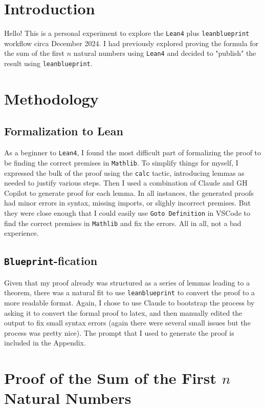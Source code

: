 


\chapter{Introduction}
Hello!  This is a personal experiment to explore the \texttt{Lean4} plus \texttt{leanblueprint} workflow circa
December 2024.  I had previously explored proving the formula for the sum of the first $n$ natural numbers 
using \texttt{Lean4} and decided to "publish" the result using \texttt{leanblueprint}.     

\chapter{Methodology}
\section{Formalization to Lean}
As a beginner to \texttt{Lean4}, I found the most difficult part of formalizing the proof to be finding the correct premises 
in \texttt{Mathlib}.  To simplify things for myself, I expressed the bulk of the proof using the \texttt{calc} 
tactic, introducing lemmas as needed to justify various steps.  Then I used a combination of Claude and
GH Copilot to generate proof for each lemma.  In all instances, the generated proofs had minor errors in
syntax, missing imports, or slighly incorrect premises.  But they were close enough that I could easily
use \texttt{Goto Definition} in VSCode to find the correct premises in \texttt{Mathlib} and fix the errors.
All in all, not a bad experience.  

\section{\texttt{Blueprint}-fication}
Given that my proof already was structured as a series of lemmas leading to a theorem, there was a natural
fit to use \texttt{leanblueprint} to convert the proof to a more readable format.  Again, I chose to use
Claude to bootstrap the process by asking it to convert the formal proof to latex, and then manually edited the output to fix 
small syntax errors (again there were several small issues but the process was pretty nice).  
The prompt that I used to generate the proof is included in the Appendix.


\chapter {Proof of the Sum of the First $n$ Natural Numbers}

